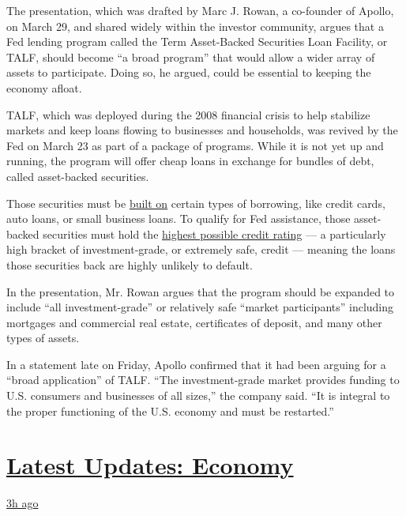 The presentation, which was drafted by Marc J. Rowan, a co-founder of
Apollo, on March 29, and shared widely within the investor community,
argues that a Fed lending program called the Term Asset-Backed
Securities Loan Facility, or TALF, should become ``a broad program''
that would allow a wider array of assets to participate. Doing so, he
argued, could be essential to keeping the economy afloat.

TALF, which was deployed during the 2008 financial crisis to help
stabilize markets and keep loans flowing to businesses and households,
was revived by the Fed on March 23 as part of a package of programs.
While it is not yet up and running, the program will offer cheap loans
in exchange for bundles of debt, called asset-backed securities.

Those securities must be
\href{https://www.federalreserve.gov/newsevents/pressreleases/files/monetary20200323b3.pdf}{built
on} certain types of borrowing, like credit cards, auto loans, or small
business loans. To qualify for Fed assistance, those asset-backed
securities must hold the
\href{https://www.federalreserve.gov/monetarypolicy/talf.htm}{highest
possible credit rating} --- a particularly high bracket of
investment-grade, or extremely safe, credit --- meaning the loans those
securities back are highly unlikely to default.

In the presentation, Mr. Rowan argues that the program should be
expanded to include ``all investment-grade'' or relatively safe ``market
participants'' including mortgages and commercial real estate,
certificates of deposit, and many other types of assets.

In a statement late on Friday, Apollo confirmed that it had been arguing
for a ``broad application'' of TALF. ``The investment-grade market
provides funding to U.S. consumers and businesses of all sizes,'' the
company said. ``It is integral to the proper functioning of the U.S.
economy and must be restarted.''

\hypertarget{latest-updates-economy}{%
\section{\texorpdfstring{\href{https://www.nytimes.com/live/2020/08/03/business/stock-market-today-coronavirus?action=click\&pgtype=Article\&state=default\&region=MAIN_CONTENT_1\&context=storylines_live_updates}{Latest
Updates:
Economy}}{Latest Updates: Economy}}\label{latest-updates-economy}}

\href{https://www.nytimes.com/live/2020/08/03/business/stock-market-today-coronavirus?action=click\&pgtype=Article\&state=default\&region=MAIN_CONTENT_1\&context=storylines_live_updates\#the-chicago-fed-president-says-its-up-to-congress-to-save-the-economy}{3h
ago}

